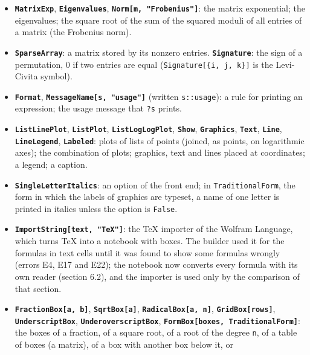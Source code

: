 \documentclass[
  10pt,
]{article}
\begin{document}
\begin{itemize}
  the shift of the bits to the right (division by a power of 2, rounded
  down); the remainder of a division.
\item
  \textbf{\texttt{MatrixExp}}, \textbf{\texttt{Eigenvalues}},
  \textbf{\texttt{Norm{[}m,\ "Frobenius"{]}}}: the matrix exponential;
  the eigenvalues; the square root of the sum of the squared moduli of
  all entries of a matrix (the Frobenius norm).
\item
  \textbf{\texttt{SparseArray}}: a matrix stored by its nonzero entries.
  \textbf{\texttt{Signature}}: the sign of a permutation, 0 if two
  entries are equal (\texttt{Signature{[}\{i,\ j,\ k\}{]}} is the
  Levi-Civita symbol).
\item
  \textbf{\texttt{Format}},
  \textbf{\texttt{MessageName{[}s,\ "usage"{]}}} (written
  \texttt{s::usage}): a rule for printing an expression; the usage
  message that \texttt{?s} prints.
\item
  \textbf{\texttt{ListLinePlot}}, \textbf{\texttt{ListPlot}},
  \textbf{\texttt{ListLogLogPlot}}, \textbf{\texttt{Show}},
  \textbf{\texttt{Graphics}}, \textbf{\texttt{Text}},
  \textbf{\texttt{Line}}, \textbf{\texttt{LineLegend}},
  \textbf{\texttt{Labeled}}: plots of lists of points (joined, as
  points, on logarithmic axes); the combination of plots; graphics, text
  and lines placed at coordinates; a legend; a caption.
\item
  \textbf{\texttt{SingleLetterItalics}}: an option of the front end; in
  \texttt{TraditionalForm}, the form in which the labels of graphics are
  typeset, a name of one letter is printed in italics unless the option
  is \texttt{False}.
\item
  \textbf{\texttt{ImportString{[}text,\ "TeX"{]}}}: the TeX importer of
  the Wolfram Language, which turns TeX into a notebook with boxes. The
  builder used it for the formulas in text cells until it was found to
  show some formulas wrongly (errors E4, E17 and E22); the notebook now
  converts every formula with its own reader (section 6.2), and the
  importer is used only by the comparison of that section.
\item
  \textbf{\texttt{FractionBox{[}a,\ b{]}}},
  \textbf{\texttt{SqrtBox{[}a{]}}},
  \textbf{\texttt{RadicalBox{[}a,\ n{]}}},
  \textbf{\texttt{GridBox{[}rows{]}}}, \textbf{\texttt{UnderscriptBox}},
  \textbf{\texttt{UnderoverscriptBox}},
  \textbf{\texttt{FormBox{[}boxes,\ TraditionalForm{]}}}: the boxes of a
  fraction, of a square root, of a root of the degree \texttt{n}, of a
  table of boxes (a matrix), of a box with another box below it, or

\end{itemize}
\end{document}
